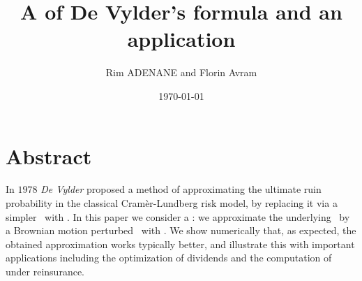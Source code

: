 \documentclass[slidetop,lecno,12pt,fleqn,mathserif]{article}
\author{Rim ADENANE and Florin Avram}
\title{A \gene of De Vylder's formula and an application}
\date{\today}
\def\BM{Brownian motion } \def\r{\rho}
\begin{document}
\maketitle
\tableofcontents

\section{Abstract}
In $1978$ \textit{De Vylder} proposed a method of approximating the ultimate ruin probability in the classical  Cramèr-Lundberg risk model, by replacing it via a simpler \proc \ with \expoj.
In this paper we consider a \gene : we approximate the underlying \proc \ by a \BM perturbed \proc \ with  \expoj. We show numerically that, as expected, the obtained approximation works typically better, and illustrate this with  important applications including the optimization of dividends and the computation of \rps under reinsurance.

%






\small


\end{document}
